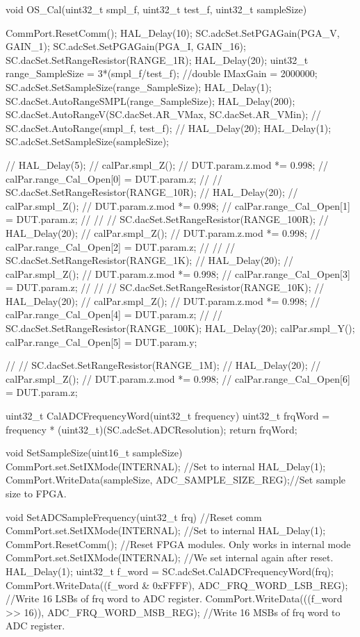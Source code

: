 void OS_Cal(uint32_t smpl_f, uint32_t test_f, uint32_t sampleSize) {
	CommPort.ResetComm();
	HAL_Delay(10);
	SC.adcSet.SetPGAGain(PGA_V, GAIN_1);
	SC.adcSet.SetPGAGain(PGA_I, GAIN_16);
	SC.dacSet.SetRangeResistor(RANGE_1R);
	HAL_Delay(20);
	uint32_t range_SampleSize = 3*(smpl_f/test_f);
	//double IMaxGain = 2000000;
	SC.adcSet.SetSampleSize(range_SampleSize);
	HAL_Delay(1);
	SC.dacSet.AutoRangeSMPL(range_SampleSize);
	HAL_Delay(200);
	SC.dacSet.AutoRangeV(SC.dacSet.AR_VMax, SC.dacSet.AR_VMin);
//	SC.dacSet.AutoRange(smpl_f, test_f);
//	HAL_Delay(20);
	HAL_Delay(1);
	SC.adcSet.SetSampleSize(sampleSize);

//	HAL_Delay(5);
//	calPar.smpl_Z();
//	DUT.param.z.mod *= 0.998;
//	calPar.range_Cal_Open[0] = DUT.param.z;
//
//	SC.dacSet.SetRangeResistor(RANGE_10R);
//	HAL_Delay(20);
//	calPar.smpl_Z();
//	DUT.param.z.mod *= 0.998;
//	calPar.range_Cal_Open[1] = DUT.param.z;
//
//
//	SC.dacSet.SetRangeResistor(RANGE_100R);
//	HAL_Delay(20);
//	calPar.smpl_Z();
//	DUT.param.z.mod *= 0.998;
//	calPar.range_Cal_Open[2] = DUT.param.z;
//
//
//	SC.dacSet.SetRangeResistor(RANGE_1K);
//	HAL_Delay(20);
//	calPar.smpl_Z();
//	DUT.param.z.mod *= 0.998;
//	calPar.range_Cal_Open[3] = DUT.param.z;
//
//
//	SC.dacSet.SetRangeResistor(RANGE_10K);
//	HAL_Delay(20);
//	calPar.smpl_Z();
//	DUT.param.z.mod *= 0.998;
//	calPar.range_Cal_Open[4] = DUT.param.z;
//
//
	SC.dacSet.SetRangeResistor(RANGE_100K);
	HAL_Delay(20);
	calPar.smpl_Y();
	calPar.range_Cal_Open[5] = DUT.param.y;

//
//	SC.dacSet.SetRangeResistor(RANGE_1M);
//	HAL_Delay(20);
//	calPar.smpl_Z();
//	DUT.param.z.mod *= 0.998;
//	calPar.range_Cal_Open[6] = DUT.param.z;



}

uint32_t CalADCFrequencyWord(uint32_t frequency){
	uint32_t frqWord = frequency * (uint32_t)(SC.adcSet.ADCResolution);
	return frqWord;
}

void SetSampleSize(uint16_t sampleSize){
	CommPort.set.SetIXMode(INTERNAL); //Set to internal
	HAL_Delay(1);
	CommPort.WriteData(sampleSize, ADC_SAMPLE_SIZE_REG);//Set sample size to FPGA.
}

void SetADCSampleFrequency(uint32_t frq){
	//Reset comm
	CommPort.set.SetIXMode(INTERNAL); //Set to internal
	HAL_Delay(1);
	CommPort.ResetComm(); //Reset FPGA modules. Only works in internal mode
	CommPort.set.SetIXMode(INTERNAL); //We set internal again after reset.
	HAL_Delay(1);
	uint32_t f_word = SC.adcSet.CalADCFrequencyWord(frq);
	CommPort.WriteData((f_word & 0xFFFF), ADC_FRQ_WORD_LSB_REG); //Write 16 LSBs of frq word to ADC register.
	CommPort.WriteData(((f_word >> 16)), ADC_FRQ_WORD_MSB_REG);  //Write 16 MSBs of frq word to ADC register.
}

